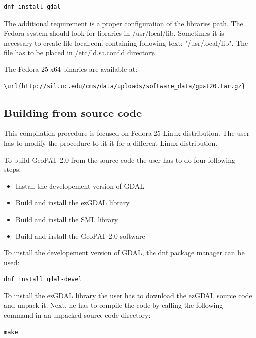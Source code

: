 \documentclass[12pt,margin=0.5in]{article}
\begin{document}
\begin{appendices}
\begin{lstlisting}
dnf install gdal
\end{lstlisting}

The additional requirement is a proper configuration of the libraries path.
The Fedora system should look for libraries in /usr/local/lib.
Sometimes it is necessary to create file local.conf containing following
text: "/usr/local/lib".
The file has to be placed in /etc/ld.so.conf.d directory.

The Fedora 25 x64 binaries are available at:

\begin{lstlisting}[frame=single]
\url{http://sil.uc.edu/cms/data/uploads/software_data/gpat20.tar.gz}
\end{lstlisting}

\subsection{Building from source code}

This compilation procedure is focused on Fedora 25
Linux distribution. The user has to modify the procedure
to fit it for a different Linux distribution.

To build GeoPAT 2.0 from the source code the user has to do four following steps:

\begin{itemize}
    \item{Install the developement version of GDAL}
    \item{Build and install the ezGDAL library}
    \item{Build and install the SML library}
    \item{Build and install the GeoPAT 2.0 software}
\end{itemize}

To install the developement version of GDAL, the dnf package manager can be used:

\begin{lstlisting}
dnf install gdal-devel
\end{lstlisting}

To install the ezGDAL library the user has to download the ezGDAL source
code and unpack it. Next, he has to compile the code by calling the following
command in an unpacked source code directory:

\begin{lstlisting}
make
\end{lstlisting}


\end{appendices}
\end{document}
